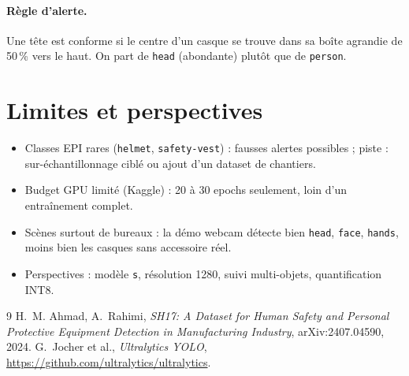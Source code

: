 \documentclass[11pt,a4paper]{article}
\begin{document}
\paragraph{Règle d'alerte.} Une tête est conforme si le centre d'un casque se trouve dans sa boîte
agrandie de 50\,\% vers le haut. On part de \texttt{head} (abondante) plutôt que de \texttt{person}.

\section{Limites et perspectives}
\begin{itemize}
  \item Classes EPI rares (\texttt{helmet}, \texttt{safety-vest}) : fausses alertes possibles ;
        piste : sur-échantillonnage ciblé ou ajout d'un dataset de chantiers.
  \item Budget GPU limité (Kaggle) : 20 à 30 epochs seulement, loin d'un entraînement complet.
  \item Scènes surtout de bureaux : la démo webcam détecte bien \texttt{head}, \texttt{face}, \texttt{hands},
        moins bien les casques sans accessoire réel.
  \item Perspectives : modèle \texttt{s}, résolution 1280, suivi multi-objets, quantification INT8.
\end{itemize}

\begin{thebibliography}{9}
 H.~M. Ahmad, A.~Rahimi, \emph{SH17: A Dataset for Human Safety and Personal Protective
Equipment Detection in Manufacturing Industry}, arXiv:2407.04590, 2024.
 G.~Jocher et al., \emph{Ultralytics YOLO}, \url{https://github.com/ultralytics/ultralytics}.
\end{thebibliography}
\end{document}
